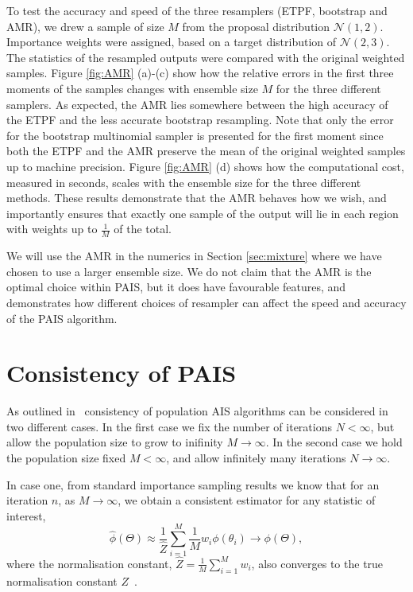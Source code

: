 \documentclass[final]{siamltex}
\begin{document}
To test the accuracy and speed of the three resamplers (ETPF,
bootstrap and AMR), we drew a sample of size $M$ from the proposal distribution
$\mathcal{N}(1,2)$. Importance weights were assigned, based on a
target distribution of $\mathcal{N}(2,3)$. The statistics of the
resampled outputs were compared with the original weighted samples. Figure \ref{fig:AMR} (a)-(c) show how the relative errors in the first
three moments of the samples changes with ensemble size $M$ for the three different
samplers. As expected, the AMR lies somewhere between the high
accuracy of the ETPF and the less accurate bootstrap
resampling. Note that only the error for the bootstrap multinomial
sampler is presented for the first moment since both the ETPF and the
AMR preserve the mean of the original weighted samples up to machine precision. Figure \ref{fig:AMR} (d) shows how the computational cost,
measured in seconds, scales with the ensemble size for the three
different methods. These results demonstrate that the AMR behaves how we wish, and
importantly ensures that exactly one sample of the output will lie in
each region with weights up to $\frac{1}{M}$ of the total.

We will use the AMR in the numerics in Section \ref{sec:mixture}
where we have chosen to use a larger ensemble size. We do not claim
that the AMR is the optimal choice within PAIS, but it does have
favourable features, and demonstrates how different choices of
resampler can affect the speed and accuracy of the PAIS algorithm.


\section{Consistency of PAIS}\label{sec:consistency}

As outlined in~\cite{martino2015adaptive} consistency of population AIS algorithms can be considered in two different cases. In the first case we fix the number of iterations $N < \infty$, but allow the population size to grow to inifinity $M\rightarrow\infty$. In the second case we hold the population size fixed $M<\infty$, and allow infinitely many iterations $N\rightarrow\infty$.

In case one, from standard importance sampling results we know that for an iteration $n$, as $M\rightarrow\infty$, we obtain a consistent estimator for any statistic of interest,
\[
	\hat{\phi}(\Theta) \approx \frac{1}{\hat{Z}}\sum\limits_{i=1}^M \! \frac{1}{M}w_i\phi(\theta_i) \rightarrow \phi(\Theta),
\]
where the normalisation constant, $\hat{Z} = \frac{1}{M}\sum_{i=1}^M \! w_i$, also converges to the true normalisation constant $Z$~\cite{robert2013monte}.
\end{document}
